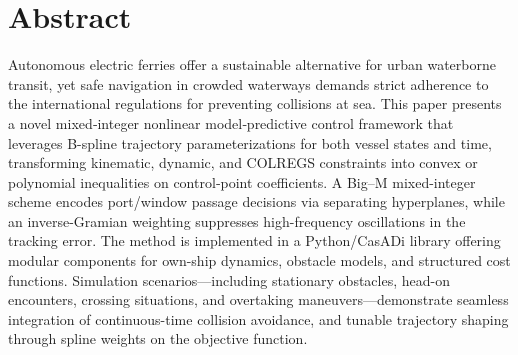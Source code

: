 
\pagestyle{fancy}
\fancyhf{}
\renewcommand{\chaptermark}[1]{\markboth{\chaptername\ \thechapter.\ #1}{}}
\renewcommand{\sectionmark}[1]{\markright{\thesection\ #1}}
\renewcommand{\headrulewidth}{0.1ex}
\renewcommand{\footrulewidth}{0.1ex}
\fancyfoot[LE,RO]{\thepage}
\fancypagestyle{plain}{\fancyhf{}\fancyfoot[LE,RO]{\thepage}\renewcommand{\headrulewidth}{0ex}}

\section*{Abstract}
\vspace{0.5cm}


Autonomous electric ferries offer a sustainable alternative for urban waterborne transit, yet safe navigation in crowded waterways demands strict adherence to the international regulations for preventing collisions at sea. This paper presents a novel mixed‐integer nonlinear model‐predictive control framework that leverages B-spline trajectory parameterizations for both vessel states and time, transforming kinematic, dynamic, and COLREGS constraints into convex or polynomial inequalities on control‐point coefficients. A Big–M mixed-integer scheme encodes port/window passage decisions via separating hyperplanes, while an inverse-Gramian weighting suppresses high-frequency oscillations in the tracking error.
The method is implemented in a Python/CasADi library offering modular components for own-ship dynamics, obstacle models, and structured cost functions. Simulation scenarios---including stationary obstacles, head-on encounters, crossing situations, and overtaking maneuvers---demonstrate seamless integration of continuous-time collision avoidance, and tunable trajectory shaping through spline weights on the objective function. 

\cleardoublepage